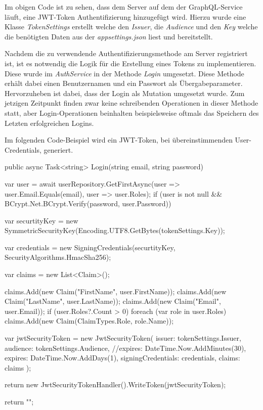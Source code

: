 Im obigen Code ist zu sehen, dass dem Server auf dem der GraphQL-Service läuft, eine JWT-Token Authentifizierung hinzugefügt wird.
Hierzu wurde eine Klasse \textit{TokenSettings} erstellt welche den \textit{Issuer}, die \textit{Audience} und den \textit{Key} welche die benötigten Daten aus der \textit{appsettings.json} liest und bereitstellt.
\newline

Nachdem die zu verwendende Authentifizierungsmethode am Server registriert ist, ist es notwendig die Logik für die Erstellung eines Tokens zu implementieren.
Diese wurde im \textit{AuthService} in der Methode \textit{Login} umgesetzt.
Diese Methode erhält dabei einen Benutzernamen und ein Passwort als Übergabeparameter.
Hervorzuheben ist dabei, dass der Login als Mutation umgesetzt wurde.
Zum jetzigen Zeitpunkt finden zwar keine schreibenden Operationen in dieser Methode statt, aber Login-Operationen beinhalten beispielsweise oftmals das Speichern des Letzten erfolgreichen Logins.
\newline

Im folgenden Code-Beispiel wird ein JWT-Token, bei übereinstimmenden User-Credentials, generiert.

\begin{JsCode}
public async Task<string> Login(string email, string password) {

    var user = await userRepository.GetFirstAsync(user => user.Email.Equals(email), user => user.Roles);
    if (user is not null && BCrypt.Net.BCrypt.Verify(password, user.Password)) {
        var securtityKey = new SymmetricSecurityKey(Encoding.UTF8.GetBytes(tokenSettings.Key));

        var credentials = new SigningCredentials(securtityKey, SecurityAlgorithms.HmacSha256);

        var claims = new List<Claim>();

        claims.Add(new Claim("FirstName", user.FirstName));
        claims.Add(new Claim("LastName", user.LastName));
        claims.Add(new Claim("Email", user.Email));
        if (user.Roles?.Count > 0) {
            foreach (var role in user.Roles) {
                claims.Add(new Claim(ClaimTypes.Role, role.Name));
            }
        }

        var jwtSecurityToken = new JwtSecurityToken(
            issuer: tokenSettings.Issuer,
            audience: tokenSettings.Audience,
            //expires: DateTime.Now.AddMinutes(30),
            expires: DateTime.Now.AddDays(1),
            signingCredentials: credentials,
            claims: claims
        );

        return new JwtSecurityTokenHandler().WriteToken(jwtSecurityToken);
    }

    return "";
}
\end{JsCode}

